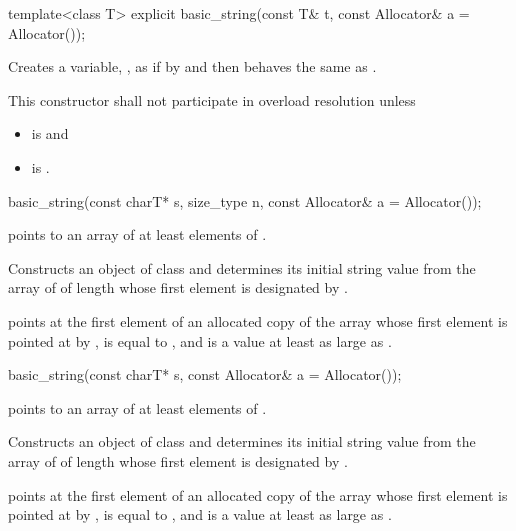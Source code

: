 %
\begin{itemdecl}
template<class T>
  explicit basic_string(const T& t, const Allocator& a = Allocator());
\end{itemdecl}

\begin{itemdescr}
\pnum
\effects Creates a variable, , as if by
 and
then behaves the same as .

\pnum
\remarks This constructor shall not participate in overload resolution unless
\begin{itemize}
\item {} is  and
\item {} is .
\end{itemize}
\end{itemdescr}

%
\begin{itemdecl}
basic_string(const charT* s, size_type n, const Allocator& a = Allocator());
\end{itemdecl}

\begin{itemdescr}
\pnum
\requires
{} points to an array of at least  elements of .

\pnum
\effects
Constructs an object of class 
and determines its initial string value from the array of
 of length  whose first element is designated by .

\pnum
\postconditions
{} points at the first element of an allocated copy
of the array whose first element is pointed at by ,
 is equal to , and  is
a value at least as large as .
\end{itemdescr}

%
\begin{itemdecl}
basic_string(const charT* s, const Allocator& a = Allocator());
\end{itemdecl}

\begin{itemdescr}
\pnum
\requires
{} points to an array of at least  elements
of .

\pnum
\effects
Constructs an object of class 
and determines its initial string value from the array of
 of length 
whose first element is designated by .

\pnum
\postconditions
{} points at the first element of an allocated copy
of the array whose first element is pointed at by ,
 is equal to , and
 is a value at least as large as .
\end{itemdescr}


